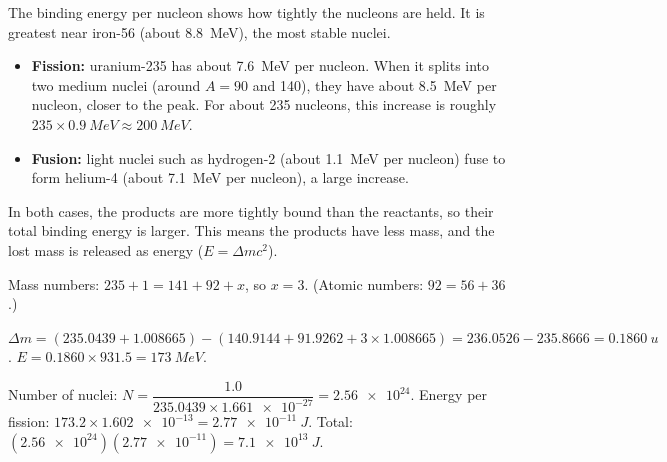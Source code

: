 \documentclass[12pt]{article}
\begin{document}
\ansq
\begin{crit}
\end{crit}
\sample
The binding energy per nucleon shows how tightly the nucleons are held. It is greatest near iron-56
(about \qty{8.8}{MeV}), the most stable nuclei.
\begin{itemize}
  \item \textbf{Fission:} uranium-235 has about \qty{7.6}{MeV} per nucleon. When it splits into two
        medium nuclei (around $A = 90$ and 140), they have about \qty{8.5}{MeV} per nucleon, closer to the
        peak. For about 235 nucleons, this increase is roughly $235 \times \qty{0.9}{MeV} \approx
        \qty{200}{MeV}$.
  \item \textbf{Fusion:} light nuclei such as hydrogen-2 (about \qty{1.1}{MeV} per nucleon) fuse to form
        helium-4 (about \qty{7.1}{MeV} per nucleon), a large increase.
\end{itemize}
In both cases, the products are more tightly bound than the reactants, so their total binding energy is
larger. This means the products have less mass, and the lost mass is released as energy ($E = \Delta m c^2$).

\ansq
{}
\begin{crit}
\end{crit}
\sample
Mass numbers: $235 + 1 = 141 + 92 + x$, so $x = 3$. (Atomic numbers: $92 = 56 + 36$.)
\begin{crit}
\end{crit}
\sample
$\Delta m = (235.0439 + 1.008665) - (140.9144 + 91.9262 + 3 \times 1.008665) = 236.0526 - 235.8666
= \qty{0.1860}{u}$. \quad $E = 0.1860 \times 931.5 = \qty{173}{MeV}$.
\begin{crit}
\end{crit}
\sample
Number of nuclei: $N = \dfrac{1.0}{235.0439 \times \num{1.661e-27}} = \num{2.56e24}$. \quad
Energy per fission: $173.2 \times \num{1.602e-13} = \qty{2.77e-11}{J}$. \quad
Total: $(\num{2.56e24})(\num{2.77e-11}) = \qty{7.1e13}{J}$.
\end{document}
